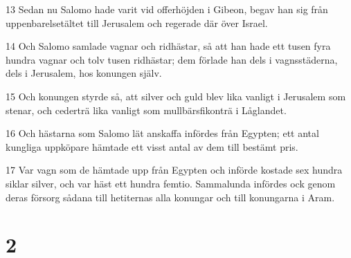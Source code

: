 \par 13 Sedan nu Salomo hade varit vid offerhöjden i Gibeon, begav han sig från uppenbarelsetältet till Jerusalem och regerade där över Israel.
\par 14 Och Salomo samlade vagnar och ridhästar, så att han hade ett tusen fyra hundra vagnar och tolv tusen ridhästar; dem förlade han dels i vagnsstäderna, dels i Jerusalem, hos konungen själv.
\par 15 Och konungen styrde så, att silver och guld blev lika vanligt i Jerusalem som stenar, och cederträ lika vanligt som mullbärsfikonträ i Låglandet.
\par 16 Och hästarna som Salomo lät anskaffa infördes från Egypten; ett antal kungliga uppköpare hämtade ett visst antal av dem till bestämt pris.
\par 17 Var vagn som de hämtade upp från Egypten och införde kostade sex hundra siklar silver, och var häst ett hundra femtio. Sammalunda infördes ock genom deras försorg sådana till hetiternas alla konungar och till konungarna i Aram.

\chapter{2}

